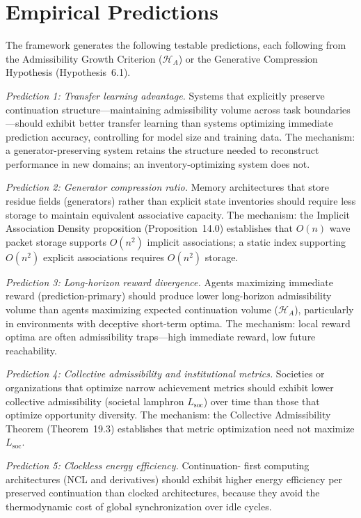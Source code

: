 \documentclass[12pt, oneside]{book}
\theoremstyle{flyxion}
\theoremstyle{definition}
\begin{document}
\section{Empirical Predictions}

The framework generates the following testable predictions, each
following from the Admissibility Growth Criterion
($\mathcal{H}_A$) or the Generative Compression Hypothesis
(Hypothesis~6.1).

\textit{Prediction 1: Transfer learning advantage.} Systems that
explicitly preserve continuation structure---maintaining admissibility
volume across task boundaries---should exhibit better transfer
learning than systems optimizing immediate prediction accuracy,
controlling for model size and training data. The mechanism: a
generator-preserving system retains the structure needed to
reconstruct performance in new domains; an inventory-optimizing system
does not.

\textit{Prediction 2: Generator compression ratio.} Memory
architectures that store residue fields (generators) rather than
explicit state inventories should require less storage to maintain
equivalent associative capacity. The mechanism: the Implicit
Association Density proposition (Proposition~14.0) establishes that
$O(n)$ wave packet storage supports $O(n^2)$ implicit associations;
a static index supporting $O(n^2)$ explicit associations requires
$O(n^2)$ storage.

\textit{Prediction 3: Long-horizon reward divergence.} Agents
maximizing immediate reward (prediction-primary) should produce
lower long-horizon admissibility volume than agents maximizing
expected continuation volume ($\mathcal{H}_A$), particularly in
environments with deceptive short-term optima. The mechanism: local
reward optima are often admissibility traps---high immediate reward,
low future reachability.

\textit{Prediction 4: Collective admissibility and institutional
metrics.} Societies or organizations that optimize narrow achievement
metrics should exhibit lower collective admissibility (societal
lamphron $L_\mathrm{soc}$) over time than those that optimize
opportunity diversity. The mechanism: the Collective Admissibility
Theorem (Theorem~19.3) establishes that metric optimization need not
maximize $L_\mathrm{soc}$.

\textit{Prediction 5: Clockless energy efficiency.} Continuation-
first computing architectures (NCL and derivatives) should exhibit
higher energy efficiency per preserved continuation than clocked
architectures, because they avoid the thermodynamic cost of global
synchronization over idle cycles.
\end{document}

